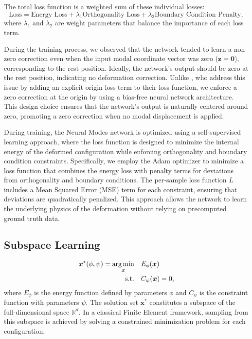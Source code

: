 The total loss function is a weighted sum of these individual losses:
\begin{equation}
    \text{Loss} = \text{Energy Loss} + \lambda_1 \text{Orthogonality Loss} + \lambda_2 \text{Boundary Condition Penalty},
\end{equation}
where $\lambda_1$ and $\lambda_2$ are weight parameters that balance the importance of each loss term.

During the training process, we observed that the network tended to learn a non-zero correction even when the input modal coordinate vector was zero (\(\bm{z} = \bm{0}\)), corresponding to the rest position. Ideally, the network's output should be zero at the rest position, indicating no deformation correction. Unlike \cite{Wang_Du_Coros_Thomaszewski_2024}, who address this issue by adding an explicit origin loss term to their loss function, we enforce a zero correction at the origin by using a bias-free neural network architecture. This design choice ensures that the network's output is naturally centered around zero, promoting a zero correction when no modal displacement is applied.

During training, the Neural Modes network is optimized using a self-supervised learning approach, where the loss function is designed to minimize the internal energy of the deformed configuration while enforcing orthogonality and boundary condition constraints. Specifically, we employ the Adam optimizer to minimize a loss function that combines the energy loss with penalty terms for deviations from orthogonality and boundary conditions. The per-sample loss function \( L \) includes a Mean Squared Error (MSE) term for each constraint, ensuring that deviations are quadratically penalized. This approach allows the network to learn the underlying physics of the deformation without relying on precomputed ground truth data.


\subsection{Subspace Learning}
\begin{align}
    \label{eq:constrained_energy_minimization}
    \bm{x}^*(\phi, \psi) = \underset{\bm{x}}{\operatorname*{arg\,min}} \quad & E_\phi(\bm{x}) \\
    \text{s.t.} \quad & C_\psi(\bm{x}) = 0, \nonumber
\end{align}
where \( E_\phi \) is the energy function defined by parameters \(\phi\) and \( C_\psi \) is the constraint function with parameters \(\psi\). The solution set \( \bm{x}^*\) constitutes a subspace of the full-dimensional space \( \mathbb{R}^d \). In a classical Finite Element framework, sampling from this subspace is achieved by solving a constrained minimization problem for each configuration. 


